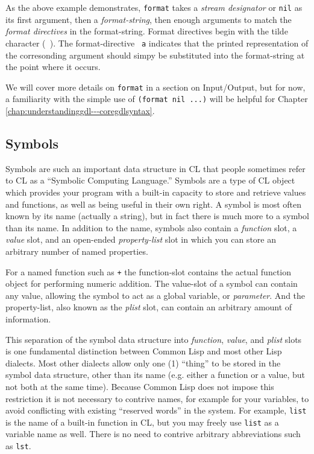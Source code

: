 \documentclass [11pt]{book}
\begin{document}
As the above example demonstrates, \texttt{format} takes a \emph{stream designator} or \texttt{nil} as its first argument, then a \emph{format-string}, then enough arguments to match the \emph{format directives} in the format-string. Format directives begin with the
tilde character (\texttt{~}).  The format-directive \texttt{~a} indicates that the printed representation of the corresonding argument should simpy be 
substituted into the format-string at the point where it occurs.



We will cover more details on \texttt{format} in a section on  Input/Output, but for now, a familiarity with the simple use of \texttt{(format nil ...)} will be helpful for Chapter 
\ref{chap:understandinggdl---coregdlsyntax}.



\subsection{Symbols}

\label{subsec:symbols}



Symbols are such an important data structure in CL that people
sometimes refer to CL as a ``Symbolic Computing Language.'' Symbols
are a type of CL object which provides your program with a built-in
capacity to store and retrieve values and functions, as well as being
useful in their own right. A symbol is most often known by its name
 (actually a string), but in fact there is much more to a symbol than
its name. In addition to the name, symbols also contain a \emph{function} slot, a \emph{value} slot, and an open-ended \emph{property-list} slot in which you can store an arbitrary number of named properties.



For a named function such as \texttt{+} the function-slot contains the actual function
object for performing numeric addition. The value-slot of a symbol can
contain any value, allowing the symbol to act as a global variable, or \emph{parameter}. And the property-list, also known as the \emph{plist} slot, can contain an arbitrary amount of information.



This separation of the symbol data structure into \emph{function}, \emph{value}, and \emph{plist} slots is one fundamental distinction between Common Lisp
and most other Lisp dialects. Most other dialects allow only one (1)
``thing'' to be stored in the symbol data structure, other than its
name (e.g. either a function or a value, but not both at the same
time). Because Common Lisp does not impose this restriction it is not
necessary to contrive names, for example for your variables, to avoid
conflicting with existing ``reserved words'' in the system. For
example, \texttt{list} is the name of a built-in function in CL, but you may
freely use \texttt{list} as a variable name as well. There is no need to
contrive arbitrary abbreviations such as \texttt{lst}.
\end{document}
